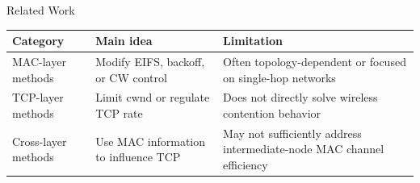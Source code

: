 \begin{frame}{Related Work}

\begin{center}
\begin{tabular}{p{} p{} p{}}
\toprule
\textbf{Category} & \textbf{Main idea} & \textbf{Limitation} \\
\midrule
MAC-layer methods & Modify EIFS, backoff, or CW control & Often topology-dependent or focused on single-hop networks \\
\addlinespace
TCP-layer methods & Limit cwnd or regulate TCP rate & Does not directly solve wireless contention behavior \\
\addlinespace
Cross-layer methods & Use MAC information to influence TCP & May not sufficiently address intermediate-node MAC channel efficiency \\
\bottomrule
\end{tabular}
\end{center}

\vspace{0.25cm}
\end{frame}
